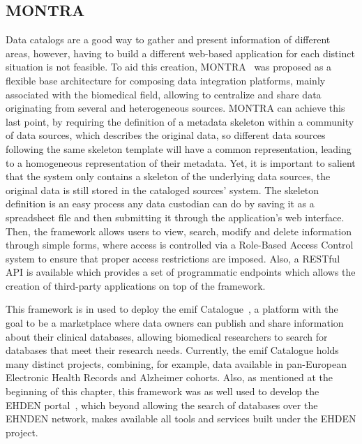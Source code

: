 \subsection*{MONTRA}
Data catalogs are a good way to gather and present information of different areas, however, having to build a different web-based application for each distinct situation is not feasible.
To aid this creation, MONTRA~\cite{montra} was proposed as a flexible base architecture for composing data integration platforms, mainly associated with the biomedical field, allowing to centralize and share data originating from several and heterogeneous sources.
MONTRA can achieve this last point, by requiring the definition of a metadata skeleton within a community of data sources, which describes the original data, so different data sources following the same skeleton template will have a common representation, leading to a homogeneous representation of their metadata.
Yet, it is important to salient that the system only contains a skeleton of the underlying data sources, the original data is still stored in the cataloged sources' system.
The skeleton definition is an easy process any data custodian can do by saving it as a spreadsheet file and then submitting it through the application's web interface.
Then, the framework allows users to view, search, modify and delete information through simple forms, where access is controlled via a Role-Based Access Control system to ensure that proper access restrictions are imposed.
Also, a RESTful API is available which provides a set of programmatic endpoints which allows the creation of third-party applications on top of the framework.

This framework is in used to deploy the \gls{emif} Catalogue~\cite{emif}, a platform with the goal to be a marketplace where data owners can publish and share information about their clinical databases, allowing biomedical researchers to search for databases that meet their research needs.
Currently, the \gls{emif} Catalogue holds many distinct projects, combining, for example, data available in pan-European Electronic Health Records and Alzheimer cohorts.
Also, as mentioned at the beginning of this chapter, this framework was as well used to develop the EHDEN portal~\cite{ehden-portal}, which beyond allowing the search of databases over the EHNDEN network, makes available all tools and services built under the EHDEN project.

